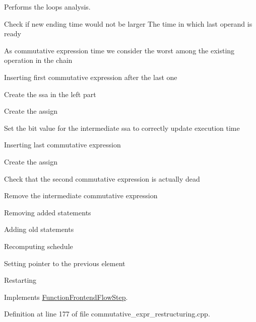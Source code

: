 Performs the loops analysis. 

Check if new ending time would not be larger The time in which last operand is ready

As commutative expression time we consider the worst among the existing operation in the chain

Inserting first commutative expression after the last one

Create the ssa in the left part

Create the assign

Set the bit value for the intermediate ssa to correctly update execution time

Inserting last commutative expression

Create the assign

Check that the second commutative expression is actually dead

Remove the intermediate commutative expression

Removing added statements

Adding old statements

Recomputing schedule

Setting pointer to the previous element

Restarting 

Implements \hyperlink{classFunctionFrontendFlowStep_a00612f7fb9eabbbc8ee7e39d34e5ac68}{Function\+Frontend\+Flow\+Step}.



Definition at line 177 of file commutative\+\_\+expr\+\_\+restructuring.\+cpp.



